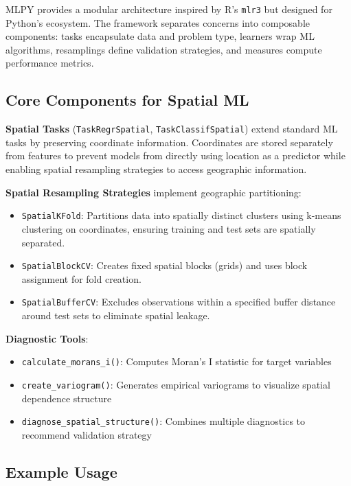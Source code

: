 \documentclass[review,12pt]{elsarticle}
\begin{document}
MLPY provides a modular architecture inspired by R's \texttt{mlr3} \citep{lang2019mlr3} but designed for Python's ecosystem. The framework separates concerns into composable components: tasks encapsulate data and problem type, learners wrap ML algorithms, resamplings define validation strategies, and measures compute performance metrics.

\subsection{Core Components for Spatial ML}

\textbf{Spatial Tasks} (\texttt{TaskRegrSpatial}, \texttt{TaskClassifSpatial}) extend standard ML tasks by preserving coordinate information. Coordinates are stored separately from features to prevent models from directly using location as a predictor while enabling spatial resampling strategies to access geographic information.

\textbf{Spatial Resampling Strategies} implement geographic partitioning:
\begin{itemize}
\item \texttt{SpatialKFold}: Partitions data into spatially distinct clusters using k-means clustering on coordinates, ensuring training and test sets are spatially separated.
\item \texttt{SpatialBlockCV}: Creates fixed spatial blocks (grids) and uses block assignment for fold creation.
\item \texttt{SpatialBufferCV}: Excludes observations within a specified buffer distance around test sets to eliminate spatial leakage.
\end{itemize}

\textbf{Diagnostic Tools}:
\begin{itemize}
\item \texttt{calculate\_morans\_i()}: Computes Moran's I statistic for target variables
\item \texttt{create\_variogram()}: Generates empirical variograms to visualize spatial dependence structure
\item \texttt{diagnose\_spatial\_structure()}: Combines multiple diagnostics to recommend validation strategy
\end{itemize}

\subsection{Example Usage}
\end{document}

